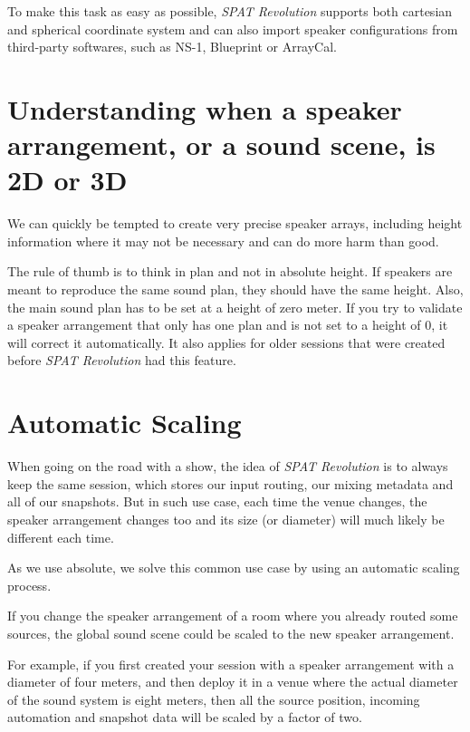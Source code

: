 \documentclass[
  letterpaper,
  DIV=11,
  numbers=noendperiod]{scrreport}
\begin{document}
To make this task as easy as possible, \emph{SPAT Revolution} supports
both cartesian and spherical coordinate system and can also import
speaker configurations from third-party softwares, such as NS-1,
Blueprint or ArrayCal.

\hypertarget{understanding-when-a-speaker-arrangement-or-a-sound-scene-is-2d-or-3d}{%
\section{Understanding when a speaker arrangement, or a sound scene, is
2D or
3D}\label{understanding-when-a-speaker-arrangement-or-a-sound-scene-is-2d-or-3d}}

We can quickly be tempted to create very precise speaker arrays,
including height information where it may not be necessary and can do
more harm than good.

The rule of thumb is to think in plan and not in absolute height. If
speakers are meant to reproduce the same sound plan, they should have
the same height. Also, the main sound plan has to be set at a height of
zero meter. If you try to validate a speaker arrangement that only has
one plan and is not set to a height of 0, it will correct it
automatically. It also applies for older sessions that were created
before \emph{SPAT Revolution} had this feature.

\hypertarget{automatic-scaling}{%
\section{Automatic Scaling}\label{automatic-scaling}}

When going on the road with a show, the idea of \emph{SPAT Revolution}
is to always keep the same session, which stores our input routing, our
mixing metadata and all of our snapshots. But in such use case, each
time the venue changes, the speaker arrangement changes too and its size
(or diameter) will much likely be different each time.

As we use absolute, we solve this common use case by using an automatic
scaling process.

If you change the speaker arrangement of a room where you already routed
some sources, the global sound scene could be scaled to the new speaker
arrangement.

For example, if you first created your session with a speaker
arrangement with a diameter of four meters, and then deploy it in a
venue where the actual diameter of the sound system is eight meters,
then all the source position, incoming automation and snapshot data will
be scaled by a factor of two.
\end{document}
